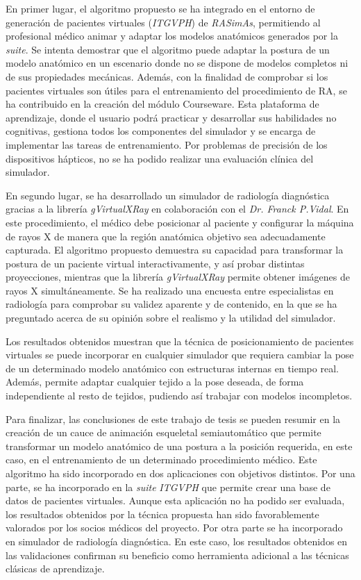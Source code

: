 En primer lugar, el algoritmo propuesto se ha integrado en el entorno de generación de pacientes virtuales (\emph{ITGVPH}) de \emph{RASimAs}, permitiendo al profesional médico animar y adaptar los modelos anatómicos generados por la \emph{suite}. Se intenta demostrar que el algoritmo puede adaptar la postura de un modelo anatómico en un escenario donde no se dispone de modelos completos ni de sus propiedades mecánicas. Además, con la finalidad de comprobar si los pacientes virtuales son útiles para el entrenamiento del procedimiento de RA, se ha contribuido en la creación del módulo Courseware. Esta plataforma de aprendizaje, donde el usuario podrá practicar y desarrollar sus habilidades no cognitivas, gestiona todos los componentes del simulador y se encarga de implementar las tareas de entrenamiento. Por problemas de precisión de los dispositivos hápticos, no se ha podido realizar una evaluación clínica del simulador. 

En segundo lugar, se ha desarrollado un simulador de radiología diagnóstica gracias a la librería \emph{gVirtualXRay} en colaboración con el \emph{Dr. Franck P.Vidal}. En este procedimiento, el médico debe posicionar al paciente y configurar la máquina de rayos X de manera que la región anatómica objetivo sea adecuadamente capturada. El algoritmo propuesto demuestra su capacidad para transformar la postura de un paciente virtual interactivamente, y así probar distintas proyecciones, mientras que la librería \emph{gVirtualXRay} permite obtener imágenes de rayos X simultáneamente. Se ha realizado una encuesta entre especialistas en radiología para comprobar su validez aparente y de contenido, en la que se ha preguntado acerca de su opinión sobre el realismo y la utilidad del simulador.

Los resultados obtenidos muestran que la técnica de posicionamiento de pacientes virtuales se puede incorporar en cualquier simulador que requiera cambiar la pose de un determinado modelo anatómico con estructuras internas en tiempo real. Además, permite adaptar cualquier tejido a la pose deseada, de forma independiente al resto de tejidos, pudiendo así trabajar con modelos incompletos.

Para finalizar, las conclusiones de este trabajo de tesis se pueden resumir en la creación de un cauce de animación esqueletal semiautomático que permite transformar un modelo anatómico de una postura a la posición requerida, en este caso, en el entrenamiento de un determinado procedimiento médico. Este algoritmo ha sido incorporado en dos aplicaciones con objetivos distintos. Por una parte, se ha incorporado en la \emph{suite} \emph{ITGVPH} que permite crear una base de datos de pacientes virtuales. Aunque esta aplicación no ha podido ser evaluada, los resultados obtenidos por la técnica propuesta han sido favorablemente valorados por los socios médicos del proyecto. Por otra parte se ha incorporado en simulador de radiología diagnóstica. En este caso, los resultados obtenidos en las validaciones confirman su beneficio como herramienta adicional a las técnicas clásicas de aprendizaje.



